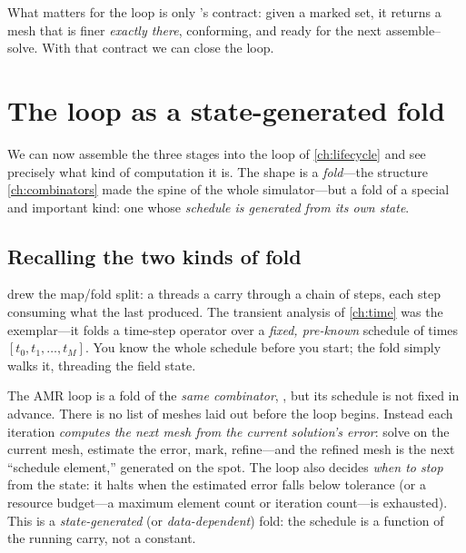 What matters for the loop is only 's contract: given a marked set, it
returns a mesh that is finer \emph{exactly there}, conforming, and ready for the next
assemble--solve. With that contract we can close the loop.

\section{The loop as a state-generated fold}
\label{sec:loop}

We can now assemble the three stages into the loop of \cref{ch:lifecycle} and see
precisely what kind of computation it is. The shape is a \emph{fold}---the structure
\cref{ch:combinators} made the spine of the whole simulator---but a fold of a special
and important kind: one whose \emph{schedule is generated from its own state}.

\subsection{Recalling the two kinds of fold}

 drew the map/fold split: a  threads a carry through a
chain of steps, each step consuming what the last produced. The transient analysis of
\cref{ch:time} was the exemplar---it folds a time-step operator over a \emph{fixed,
pre-known} schedule of times $[t_0, t_1, \dots, t_M]$. You know the whole schedule
before you start; the fold simply walks it, threading the field state.

The AMR loop is a fold of the \emph{same combinator}, , but its
schedule is not fixed in advance. There is no list of meshes laid out before the loop
begins. Instead each iteration \emph{computes the next mesh from the current
solution's error}: solve on the current mesh, estimate the error, mark, refine---and
the refined mesh is the next ``schedule element,'' generated on the spot. The loop
also decides \emph{when to stop} from the state: it halts when the estimated error
falls below tolerance (or a resource budget---a maximum element count or iteration
count---is exhausted). This is a \emph{state-generated} (or \emph{data-dependent})
fold: the schedule is a function of the running carry, not a constant.

